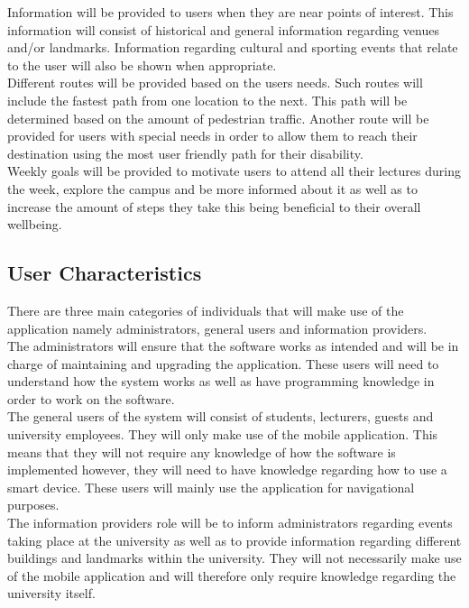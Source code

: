 \documentclass[11pt, a4paper]{article}
\begin{document}
	Information will be provided to users when they are near points of interest. This information will consist of historical and general information regarding venues and/or landmarks. Information regarding cultural and sporting events that relate to the user will also be shown when appropriate.
	\\

	Different routes will be provided based on the users needs. Such routes will include the fastest path from one location to the next. This path will be determined based on the amount of pedestrian traffic. Another route will be provided for users with special needs in order to allow them to reach their destination using the most user friendly path for their disability.
	\\

	Weekly goals will be provided to motivate users to attend all their lectures during the week,  explore the campus and be more informed about it as well as to increase the amount of steps they take this being beneficial to their overall wellbeing.

	\subsection{User Characteristics}
	There are three main categories of individuals that will make use of the application namely administrators,  general users and information providers.
	\\


	The administrators will ensure that the software works as intended and will be in charge of maintaining and upgrading the application. These users will need to understand how the system works as well as have programming knowledge in order to work on the software.
	\\

	The general users of the system will consist of students,  lecturers,  guests and university employees. They will only make use of the mobile application. This means that they will not require any knowledge of how the software is implemented however,  they will need to have knowledge regarding how to use a smart device. These users will mainly use the application for navigational purposes.
	\\

	The information providers role will be to inform administrators regarding events taking place at the university as well as to provide information regarding different buildings and landmarks within the university. They will not necessarily make use of the mobile application and will therefore only require knowledge regarding the university itself.
\end{document}
